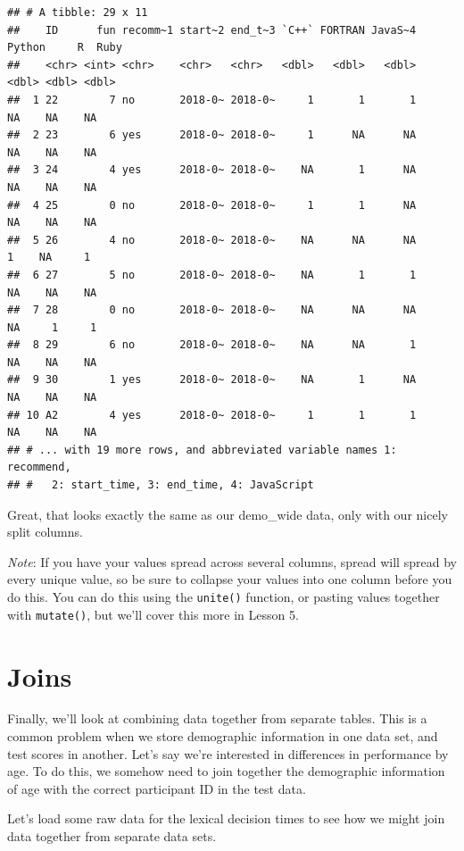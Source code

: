 \documentclass[
]{book}
\begin{document}
\begin{verbatim}
## # A tibble: 29 x 11
##    ID      fun recomm~1 start~2 end_t~3 `C++` FORTRAN JavaS~4 Python     R  Ruby
##    <chr> <int> <chr>    <chr>   <chr>   <dbl>   <dbl>   <dbl>  <dbl> <dbl> <dbl>
##  1 22        7 no       2018-0~ 2018-0~     1       1       1     NA    NA    NA
##  2 23        6 yes      2018-0~ 2018-0~     1      NA      NA     NA    NA    NA
##  3 24        4 yes      2018-0~ 2018-0~    NA       1      NA     NA    NA    NA
##  4 25        0 no       2018-0~ 2018-0~     1       1      NA     NA    NA    NA
##  5 26        4 no       2018-0~ 2018-0~    NA      NA      NA      1    NA     1
##  6 27        5 no       2018-0~ 2018-0~    NA       1       1     NA    NA    NA
##  7 28        0 no       2018-0~ 2018-0~    NA      NA      NA     NA     1     1
##  8 29        6 no       2018-0~ 2018-0~    NA      NA       1     NA    NA    NA
##  9 30        1 yes      2018-0~ 2018-0~    NA       1      NA     NA    NA    NA
## 10 A2        4 yes      2018-0~ 2018-0~     1       1       1     NA    NA    NA
## # ... with 19 more rows, and abbreviated variable names 1: recommend,
## #   2: start_time, 3: end_time, 4: JavaScript
\end{verbatim}

Great, that looks exactly the same as our demo\_wide data, only with our nicely split columns.

\emph{Note}: If you have your values spread across several columns, spread will spread by every unique value, so be sure to collapse your values into one column before you do this. You can do this using the \texttt{unite()} function, or pasting values together with \texttt{mutate()}, but we'll cover this more in Lesson 5.

\hypertarget{joins}{%
\section{Joins}\label{joins}}

Finally, we'll look at combining data together from separate tables. This is a common problem when we store demographic information in one data set, and test scores in another. Let's say we're interested in differences in performance by age. To do this, we somehow need to join together the demographic information of age with the correct participant ID in the test data.

Let's load some raw data for the lexical decision times to see how we might join data together from separate data sets.
\end{document}

